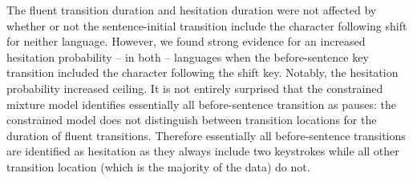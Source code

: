 \documentclass[
  english,
  man,floatsintext]{apa7}
\begin{document}
\begin{appendix}
The fluent transition duration and hesitation duration were not affected
by whether or not the sentence-initial transition include the character
following shift for neither language. However, we found strong evidence
for an increased hesitation probability -- in both -- languages when the
before-sentence key transition included the character following the
shift key. Notably, the hesitation probability increased ceiling. It is
not entirely surprised that the constrained mixture model identifies
essentially all before-sentence transition as pauses: the constrained
model does not distinguish between transition locations for the duration
of fluent transitions. Therefore essentially all before-sentence
transitions are identified as hesitation as they always include two
keystrokes while all other transition location (which is the majority of
the data) do not.
\end{appendix}

\clearpage
\makeatletter
\efloat@restorefloats
\makeatother
\end{document}
